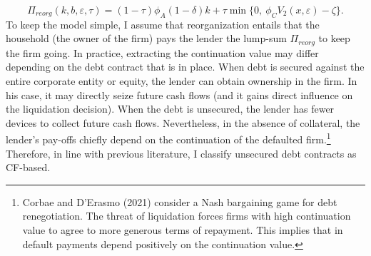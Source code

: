\documentclass[12pt]{article}
\begin{document}
\begin{equation}  \label{eq:P_reorg}
   \Pi_{reorg}(k,b,\varepsilon,\tau) = (1-\tau) \phi_A (1-\delta) k +\tau \min \{ 0, \ \phi_C V_2 (x, \varepsilon) - \zeta \}.
\end{equation}
To keep the model simple, I assume that reorganization entails that the household (the owner of the firm) pays the lender the lump-sum $\Pi_{reorg}$ to keep the firm going. In practice, extracting the continuation value may differ depending on the debt contract that is in place. When debt is secured against the entire corporate entity or equity, the lender can obtain ownership in the firm. In his case, it may directly seize future cash flows (and it gains direct influence on the liquidation decision). When the debt is unsecured, the lender has fewer devices to collect future cash flows. Nevertheless, in the absence of collateral, the lender's pay-offs chiefly depend on the continuation of the defaulted firm.\footnote{Corbae and D'Erasmo (2021) consider a Nash bargaining game for debt renegotiation. The threat of liquidation forces firms with high continuation value to agree to more generous terms of repayment. This implies that in default payments depend positively on the continuation value.} Therefore, in line with previous literature, I classify unsecured debt contracts as CF-based. 
\end{document}
